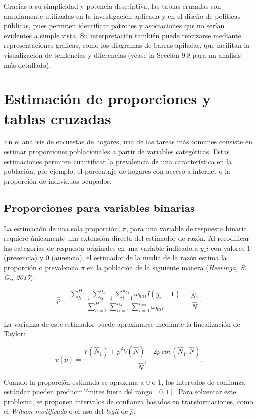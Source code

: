 \documentclass[
  spanish,
  12pt,
]{book}
\begin{document}
Gracias a su simplicidad y potencia descriptiva, las tablas cruzadas son ampliamente utilizadas en la investigación aplicada y en el diseño de políticas públicas, pues permiten identificar patrones y asociaciones que no serían evidentes a simple vista. Su interpretación también puede reforzarse mediante representaciones gráficas, como los diagramas de barras apiladas, que facilitan la visualización de tendencias y diferencias (véase la Sección 9.8 para un análisis más detallado).

\section{Estimación de proporciones y tablas cruzadas}\label{estimaciuxf3n-de-proporciones-y-tablas-cruzadas}

En el análisis de encuestas de hogares, una de las tareas más comunes consiste en estimar proporciones poblacionales a partir de variables categóricas. Estas estimaciones permiten cuantificar la prevalencia de una característica en la población, por ejemplo, el porcentaje de hogares con acceso a internet o la proporción de individuos ocupados.

\subsection{Proporciones para variables binarias}\label{proporciones-para-variables-binarias}

La estimación de una sola proporción, \(\pi\), para una variable de respuesta binaria requiere únicamente una extensión directa del estimador de razón. Al recodificar las categorías de respuesta originales en una variable indicadora \(y\_{i}\) con valores \(1\) (presencia) y \(0\) (ausencia), el estimador de la media de la razón estima la proporción o prevalencia \(\pi\) en la población de la siguiente manera (\emph{Heeringa, S. G., 2017}):

\[
\hat{p} = \frac{\sum_{h=1}^{H}\sum_{\alpha=1}^{\alpha_{h}}\sum_{i=1}^{n_{h\alpha}} \omega_{h\alpha i}I(y_{i}=1)}{\sum_{h=1}^{H}\sum_{\alpha=1}^{\alpha_{h}}\sum_{i=1}^{n_{h\alpha}} \omega_{h\alpha i}}
= \frac{\hat{N}_{1}}{\hat{N}}.
\]

La varianza de este estimador puede aproximarse mediante la linealización de Taylor:

\[
v(\hat{p}) \dot{=} \frac{V(\hat{N}_{1})+\hat{p}^{2}V(\hat{N})-2\hat{p}\,cov(\hat{N}_{1},\hat{N})}{\hat{N}^{2}}.
\]

Cuando la proporción estimada se aproxima a 0 o 1, los intervalos de confianza estándar pueden producir límites fuera del rango \([0,1]\). Para solventar este problema, se proponen intervalos de confianza basados en transformaciones, como el \emph{Wilson modificado} o el uso del \emph{logit} de \(\hat{p}\):
\end{document}
